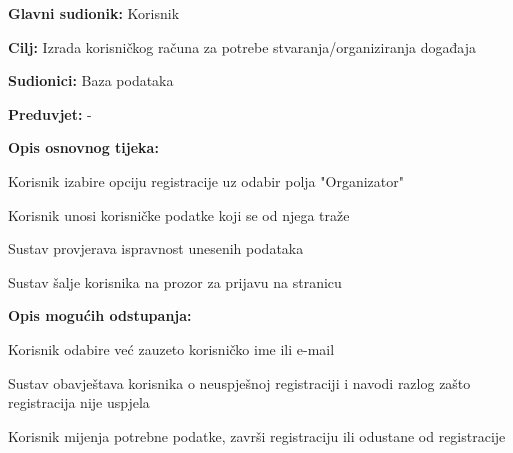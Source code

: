 					\noindent {}
					\begin{packed_item}
					\item \textbf{Glavni sudionik:} Korisnik
					\item  \textbf{Cilj:} Izrada korisničkog računa za potrebe stvaranja/organiziranja događaja
					\item  \textbf{Sudionici:} Baza podataka
					\item  \textbf{Preduvjet:} -
					\item  \textbf{Opis osnovnog tijeka:}
					
					\item[] \begin{packed_enum}
						
						\item Korisnik izabire opciju registracije uz odabir polja "Organizator"
						\item Korisnik unosi korisničke podatke koji se od njega traže
						\item Sustav provjerava ispravnost unesenih podataka
						\item Sustav šalje korisnika na prozor za prijavu na stranicu
					\end{packed_enum}
					
							\item  \textbf{Opis mogućih odstupanja:}
					
					\item[] \begin{packed_item}
						
						\item[2.a] Korisnik odabire već zauzeto korisničko ime ili e-mail 
						\item[] \begin{packed_enum}
							
							\item Sustav obavještava korisnika o neuspješnoj registraciji i navodi razlog zašto
							registracija nije uspjela 
							\item Korisnik mijenja potrebne podatke, završi registraciju ili odustane od registracije
							
						\end{packed_enum}
					\end{packed_item}
					
				\end{packed_item}
			

